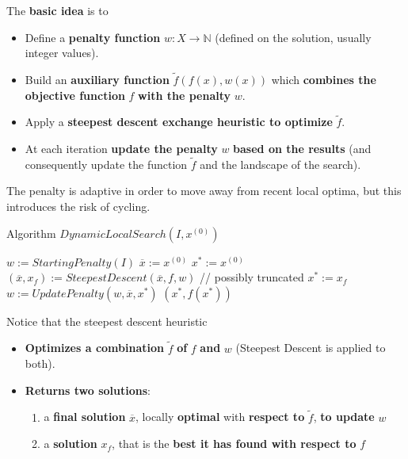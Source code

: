 The \textbf{basic idea} is to
\begin{itemize}
	\item Define a \textbf{penalty function} $w : X \rightarrow \mathbb{N}$ (defined on the solution, usually integer values).\\
	
	\item Build an \textbf{auxiliary function} $\tilde{f} (f (x) , w (x))$ which \textbf{combines the objective function} $f$ \textbf{with the penalty} $w$.\\
	
	\item Apply a \textbf{steepest descent exchange heuristic to optimize} $\tilde{f}$.\\
	
	\item At each iteration \textbf{update the penalty} $w$ \textbf{based on the results} (and consequently update the function $\tilde{f}$ and the landscape of the search).\\
\end{itemize}

The penalty is adaptive in order to move away from recent local optima, but this introduces the risk of cycling.\\

\newpage

\begin{algorithm}
	\caption{Algorithm $DynamicLocalSearch(I , x^{(0)})$}
	\begin{algorithmic}
		\STATE $w := StartingPenalty(I )$
		\STATE $\overline{x} := x^{(0)}$
		\STATE $x^\ast := x^{(0)}$
		\STATE $(\overline{x}, x_f) := SteepestDescent(\overline{x}, f , w )$ // possibly truncated
		\STATE $x^\ast := x_f$
		\ENDIF
		\STATE $w := UpdatePenalty(w, \overline{x}, x^\ast)$
		\ENDWHILE
		\RETURN $(x^\ast, f (x^\ast))$
	\end{algorithmic}
\end{algorithm}
Notice that the steepest descent heuristic
\begin{itemize}
	\item \textbf{Optimizes a combination} $\tilde{f}$ \textbf{of} $f$ \textbf{and} $w$ (Steepest Descent is applied to both).\\
	
	\item \textbf{Returns two solutions}:
	\begin{enumerate}
		\item a \textbf{final solution} $\overline{x}$, locally \textbf{optimal} with \textbf{respect to} $\tilde{f}$, \textbf{to update} $w$
		\item a \textbf{solution} $x_f$, that is the \textbf{best it has found with respect to} $f$
	\end{enumerate}
\end{itemize}

